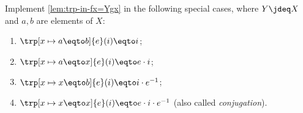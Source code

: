 \begin{xca}\label{xca:trp-in-a/x=b/x}
Implement \cref{lem:trp-in-fx=Ygx} in the following special cases,
where $Y\jdeq X$ and $a,b$ are elements of $X$:
\begin{enumerate}
\item $\trp[x\mapsto a \eqto b]{e} (i) \eqto i$;
\item\label{trp-in-a=x} $\trp[x\mapsto a \eqto x]{e} (i) \eqto e\cdot i$;
\item\label{trp-in-x=a} $\trp[x\mapsto x \eqto b]{e} (i) \eqto i \cdot e^{-1}$;
\item\label{trp-in-x=x} $\trp[x\mapsto x \eqto x]{e} (i) \eqto e \cdot i\cdot e^{-1}$
(also called \emph{conjugation}).\qedhere
\end{enumerate}
\end{xca}

